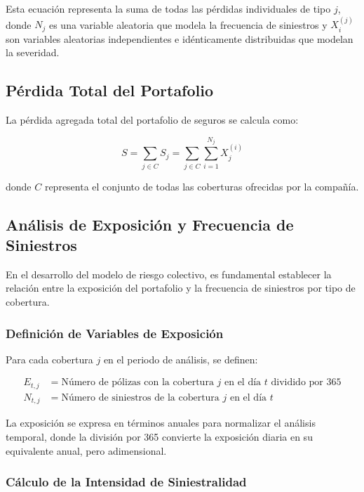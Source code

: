Esta ecuación representa la suma de todas las pérdidas individuales de tipo $j$, donde $N_j$ es una variable aleatoria que modela la frecuencia de siniestros y $X_i^{(j)}$ son variables aleatorias independientes e idénticamente distribuidas que modelan la severidad.

\subsection{Pérdida Total del Portafolio}

La pérdida agregada total del portafolio de seguros se calcula como:

\begin{equation}
S = \sum_{j \in C} S_j = \sum_{j \in C} \sum_{i=1}^{N_j} X_j^{(i)}
\end{equation}

donde $C$ representa el conjunto de todas las coberturas ofrecidas por la compañía.

\medskip

\subsection{Análisis de Exposición y Frecuencia de Siniestros}

En el desarrollo del modelo de riesgo colectivo, es fundamental establecer la relación entre la exposición del portafolio y la frecuencia de siniestros por tipo de cobertura.

\subsubsection{Definición de Variables de Exposición}

Para cada cobertura $j$ en el periodo de análisis, se definen:

\begin{align*}
E_{t,j} &= \text{Número de pólizas con la cobertura } j \text{ en el día } t \text{ dividido por 365} \\
N_{t,j} &= \text{Número de siniestros de la cobertura } j \text{ en el día } t
\end{align*}

La exposición se expresa en términos anuales para normalizar el análisis temporal, donde la división por 365 convierte la exposición diaria en su equivalente anual, pero adimensional.

\subsubsection{Cálculo de la Intensidad de Siniestralidad}


